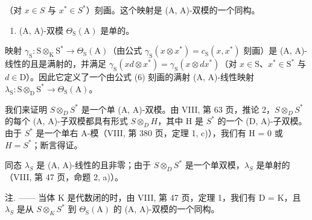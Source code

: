 （对 \(x \in S\) 与 \(x^{*} \in S^{*}\)）刻画。这个映射是 (A, A)-双模的一个同构。

\begin{enumerate}
\def\labelenumi{\alph{enumi})}
\setcounter{enumi}{1}
\tightlist
\item
  (A, A)-双模 \(\Theta_{\mathrm{S}}(\mathrm{A})\) 是单的。
\end{enumerate}

映射 \(\gamma_{\mathrm{S}}: \mathrm{S} \otimes_{\mathrm{K}} \mathrm{S}^{*} \to \Theta_{\mathrm{S}}(\mathrm{A})\)（由公式 \(\gamma_{\mathrm{S}}(x \otimes x^{*}) = c_{\mathrm{S}}(x, x^{*})\) 刻画）是 (A, A)-线性的且是满射的，并满足 \(\gamma_{\mathrm{S}}(xd \otimes x^{*}) = \gamma_{\mathrm{S}}(x \otimes dx^{*})\)（对 \(x \in \mathrm{S}\)、\(x^{*} \in \mathrm{S}^{*}\) 与 \(d \in \mathrm{D}\)）。因此它定义了一个由公式 (6) 刻画的满射 (A, A)-线性映射 \(\lambda_{\mathrm{S}}: \mathrm{S} \otimes_{\mathrm{D}} \mathrm{S}^{*} \to \Theta_{\mathrm{S}}(\mathrm{A})\)。

我们来证明 \(S \otimes_{D} S^{*}\) 是一个单 (A, A)-双模。由 VIII, 第 63 页，推论 2，\(S \otimes_{D} S^{*}\) 的每个 (A, A)-子双模都具有形式 \(S \otimes_{D} H\)，其中 H 是 \(S^{*}\) 的一个 (D, A)-子双模。由于 \(S^{*}\) 是一个单右 A-模（VIII, 第 380 页，定理 1, c)），我们有 H = 0 或 \(H = S^{*}\)；断言得证。

同态 \(\lambda_{S}\) 是 (A, A)-线性的且非零；由于 \(S \otimes_{D} S^{*}\) 是一个单双模，\(\lambda_{S}\) 是单射的（VIII, 第 47 页，命题 2, a)）。

注. —— 当体 K 是代数闭的时，由 VIII, 第 47 页，定理 1，我们有 D = K，且 \(\lambda_{S}\) 是从 \(S \otimes_{K} S^{*}\) 到 \(\Theta_{\mathrm{S}}(\mathrm{A})\) 的 (A, A)-双模的一个同构。
